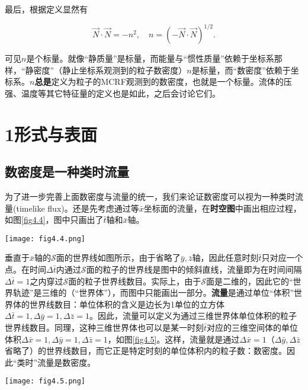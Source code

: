 最后，根据定义显然有
\begin{shaded}
\begin{equation}
    \vec{N} \cdot \vec{N} = -n^2, \quad n = (- \vec{N} \cdot \vec{N})^{1/2}.
\label{equ4.6}
\end{equation}
\end{shaded}
可见$n$是个标量。就像“静质量”是标量，而能量与“惯性质量”依赖于坐标系那样，“静密度”（静止坐标系观测到的粒子数密度）$n$是标量，而“数密度”依赖于坐标系。$n$\textbf{总是}定义为粒子的MCRF观测到的数密度，也就是一个标量。流体的压强、温度等其它特征量的定义也是如此，之后会讨论它们。

\section{1形式与表面}
\label{sec4.3}

\subsection*{数密度是一种类时流量}
为了进一步完善上面数密度与流量的统一，我们来论证数密度可以视为一种类时流量(timelike flux)。还是先考虑通过等$\bar{x}$坐标面的流量，在\textbf{时空图}中画出相应过程，如图\ref{fig4.4}，图中只画出了$\bar{t}$轴和$\bar{x}$轴。

{
    \centering
    \texttt{[image: fig4.4.png]}
    \label{fig4.4}
}

垂直于$\bar{x}$轴的$\mathscr{S}$面的世界线如图所示，由于省略了$\bar{y}, \bar{z}$轴，因此任意时刻$\bar{t}$只对应一个点。在时间$\Delta \bar{t}$内通过$\mathscr{S}$面的粒子的世界线是图中的倾斜直线，流量即为在时间间隔$\Delta \bar{t} = 1$之内穿过$\mathscr{S}$面的粒子世界线数目。实际上，由于$\mathscr{S}$面是二维的，因此它的“世界轨迹”是三维的（“世界体”），而图中只能画出一部分。\textbf{流量}是通过单位“体积”世界体的世界线数目：单位体积的含义是边长为1单位的立方体$\Delta \bar{t} = 1, \Delta \bar{y} = 1, \Delta \bar{z} = 1$。因此，流量可以定义为通过三维世界体单位体积的粒子世界线数目。同理，这种三维世界体也可以是某一时刻$\bar{t}$对应的三维空间体的单位体积$\Delta \bar{x} = 1, \Delta \bar{y} = 1, \Delta \bar{z} = 1$，如图\ref{fig4.5}。这样，流量就是通过$\Delta \bar{x} = 1$（$\Delta \bar{y}, \Delta \bar{z}$省略了）的世界线数目，而它正是特定时刻的单位体积内的粒子数：数密度。因此“类时”流量是数密度。

{
    \centering
    \texttt{[image: fig4.5.png]}
    \label{fig4.5}
}

